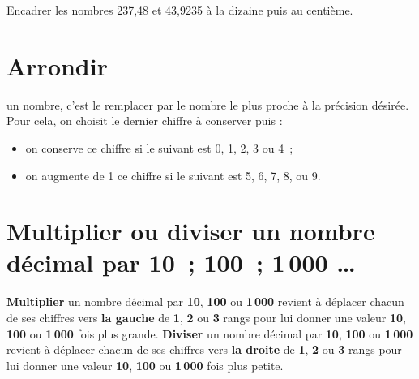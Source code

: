 
Encadrer les nombres 237,48 et 43,9235 à la dizaine puis au centième.

\section{Arrondir}

\begin{aconnaitre}
\textbf{} un nombre, c’est le remplacer par le nombre le plus proche à la précision désirée. Pour cela, on choisit le dernier chiffre à conserver puis :
\begin{itemize}
 \item on conserve ce chiffre si le suivant est 0, 1, 2, 3 ou 4 ;
 \item on augmente de 1 ce chiffre si le suivant est 5, 6, 7, 8, ou 9.
 \end{itemize}
\end{aconnaitre}


\section{Multiplier ou diviser un nombre décimal par 10 ; 100 ; 1\,000 \ldots}

\begin{aconnaitre}
\textbf{Multiplier} un nombre décimal par \textcolor{A1}{\textbf{10}}, \textcolor{B1}{\textbf{100}} ou \textcolor{J1}{\textbf{1\,000}} revient à déplacer chacun de ses chiffres vers \textbf{la gauche} de \textcolor{A1}{\textbf{1}}, \textcolor{B1}{\textbf{2}} ou \textcolor{J1}{\textbf{3}} rangs pour lui donner une valeur \textcolor{A1}{\textbf{10}}, \textcolor{B1}{\textbf{100}} ou \textcolor{J1}{\textbf{1\,000}} fois plus grande.
\textbf{Diviser} un nombre décimal par \textcolor{A1}{\textbf{10}}, \textcolor{B1}{\textbf{100}} ou \textcolor{J1}{\textbf{1\,000}} revient à déplacer chacun de ses chiffres vers \textbf{la droite} de \textcolor{A1}{\textbf{1}}, \textcolor{B1}{\textbf{2}} ou \textcolor{J1}{\textbf{3}} rangs pour lui donner une valeur  \textcolor{A1}{\textbf{10}}, \textcolor{B1}{\textbf{100}} ou \textcolor{J1}{\textbf{1\,000}} fois plus petite.
\end{aconnaitre}

